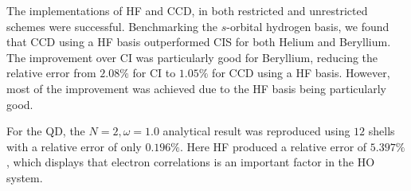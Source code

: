 The implementations of HF and CCD, in both restricted and unrestricted schemes were successful. Benchmarking the $s$-orbital hydrogen basis, we found that CCD using a HF basis outperformed CIS for both Helium and Beryllium. The improvement over CI was particularly good for Beryllium, reducing the relative error from $2.08\%$ for CI to $1.05\%$ for CCD using a HF basis. However, most of the improvement was achieved due to the HF basis being particularly good.

For the QD, the $N = 2, \omega = 1.0$ analytical result was reproduced using $12$ shells with a relative error of only $0.196\%$. Here HF produced a relative error of $5.397\%$, which displays that electron correlations is an important factor in the HO system. 